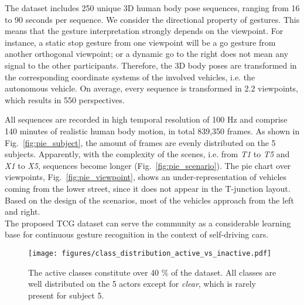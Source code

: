 \documentclass[letterpaper, 10 pt, conference]{ieeeconf}
\begin{document}
The dataset includes 250 unique 3D human body pose sequences, ranging from 16 to 90 seconds per sequence. We consider the directional property of gestures. This means that the gesture interpretation strongly depends on the viewpoint. For instance, a static stop gesture from one viewpoint will be a go gesture from another orthogonal viewpoint; or a dynamic go to the right does not mean any signal to the other participants. Therefore, the 3D body poses are transformed in the corresponding coordinate systems of the involved vehicles, i.e. the autonomous vehicle. On average, every sequence is transformed in 2.2 viewpoints, which results in 550 perspectives. 

All sequences are recorded in high temporal resolution of 100 Hz and comprise 140 minutes of realistic human body motion, in total 839,350 frames. As shown in Fig.~\ref{fig:pie_subject}, the amount of frames are evenly distributed on the 5 subjects. Apparently, with the complexity of the scenes, i.e. from \emph{T1} to \emph{T5} and \emph{X1} to \emph{X5}, sequences become longer (Fig.~\ref{fig:pie_scenario}). The pie chart over viewpoints, Fig.~\ref{fig:pie_viewpoint}, shows an under-representation of vehicles coming from the lower street, since it does not appear in the T-junction layout. Based on the design of the scenarios, most of the vehicles approach from the left and right. \\
The proposed TCG dataset can serve the community as a considerable learning base for continuous gesture recognition in the context of self-driving cars.

\begin{figure}[t]
    \texttt{[image: figures/class\_distribution\_active\_vs\_inactive.pdf]}
    \caption{The active classes constitute over 40 \% of the dataset. All classes are well distributed on the 5 actors except for \emph{clear}, which is rarely present for subject 5.}
    \label{fig:class_distribution}
\end{figure}

\begingroup
\setlength{\tabcolsep}{7pt}
\end{document}
